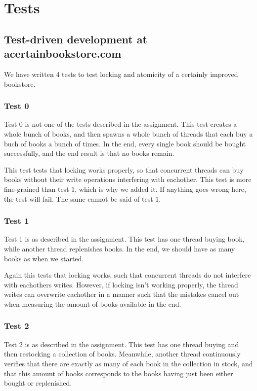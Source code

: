 \chapter{Tests}

\section{Test-driven development at acertainbookstore.com}
We have written 4 tests to test locking and atomicity of a certainly improved bookstore.

\subsection{Test 0}
Test 0 is not one of the tests described in the assignment. This test creates a whole bunch of books, and then spawns a whole bunch of threads that each buy a buch of books a bunch of times. In the end, every single book should be bought successfully, and the end result is that no books remain.

This test tests that locking works properly, so that concurrent threads can buy books without their write operations interfering with eachother. This test is more fine-grained than test 1, which is why we added it. If anything goes wrong here, the test will fail. The same cannot be said of test 1.

\subsection{Test 1}
Test 1 is as described in the assignment. This test has one thread buying book, while another thread replenishes books. In the end, we should have as many books as when we started.

Again this tests that locking works, such that concurrent threads do not interfere with eachothers writes. However, if locking isn't working properly, the thread writes can overwrite eachother in a manner such that the mistakes cancel out when measuring the amount of books available in the end.

\subsection{Test 2}
Test 2 is as described in the assignment. This test has one thread buying and then restocking a collection of books. Meanwhile, another thread continuously verifies that there are exactly as many of each book in the collection in stock, and that this amount of books corresponds to the books having just been either bought or replenished.

